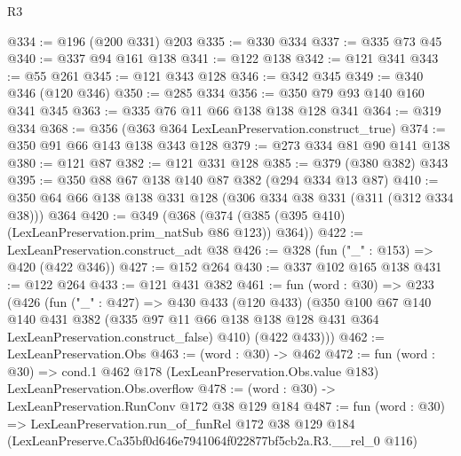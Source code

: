\begin{lexlean}{R3}
\begin{coremodule}
@334 := @196 (@200 @331) @203
@335 := @330 @334
@337 := @335 @73 @45
@340 := @337 @94 @161 @138
@341 := @122 @138
@342 := @121 @341
@343 := @55 @261
@345 := @121 @343 @128
@346 := @342 @345
@349 := @340 @346 (@120 @346)
@350 := @285 @334
@356 := @350 @79 @93 @140 @160 @341 @345
@363 := @335 @76 @11 @66 @138 @138 @128 @341
@364 := @319 @334
@368 := @356 (@363 @364 LexLeanPreservation.construct_true)
@374 := @350 @91 @66 @143 @138 @343 @128
@379 := @273 @334 @81 @90 @141 @138
@380 := @121 @87
@382 := @121 @331 @128
@385 := @379 (@380 @382) @343
@395 := @350 @88 @67 @138 @140 @87 @382 (@294 @334 @13 @87)
@410 := @350 @64 @66 @138 @138 @331 @128 (@306 @334 @38 @331 (@311 (@312 @334 @38))) @364
@420 := @349 (@368 (@374 (@385 (@395 @410) (LexLeanPreservation.prim_natSub @86 @123)) @364))
@422 := LexLeanPreservation.construct_adt @38
@426 := @328 (fun ("_" : @153) => @420 (@422 @346))
@427 := @152 @264
@430 := @337 @102 @165 @138
@431 := @122 @264
@433 := @121 @431 @382
@461 := fun (word : @30) =>
  @233
    (@426
      (fun ("_" : @427) =>
      @430
        @433
        (@120 @433)
        (@350
          @100
          @67
          @140
          @140
          @431
          @382
          (@335 @97 @11 @66 @138 @138 @128 @431 @364 LexLeanPreservation.construct_false)
          @410)
        (@422 @433)))
@462 := LexLeanPreservation.Obs
@463 := (word : @30) -> @462
@472 := fun (word : @30) =>
  cond.{1} @462 @178 (LexLeanPreservation.Obs.value @183) LexLeanPreservation.Obs.overflow
@478 := (word : @30) -> LexLeanPreservation.RunConv @172 @38 @129 @184
@487 := fun (word : @30) =>
  LexLeanPreservation.run_of_funRel
    @172
    @38
    @129
    @184
    (LexLeanPreserve.Ca35bf0d646e7941064f022877bf5cb2a.R3.__rel_0 @116)
\end{coremodule}
\end{lexlean}
